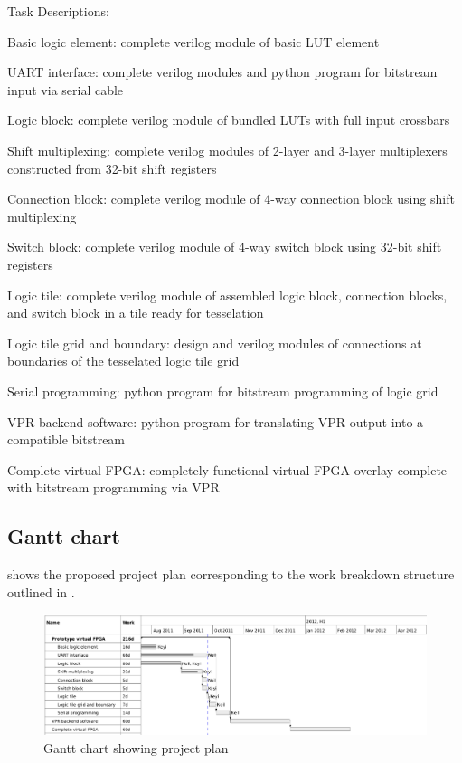 Task Descriptions:
\begin{itemlist}
	\item Basic logic element: complete verilog module of basic LUT element
	\item UART interface: complete verilog modules and python program for bitstream input via serial cable
	\item Logic block: complete verilog module of bundled LUTs with full input crossbars
	\item Shift multiplexing: complete verilog modules of 2-layer and 3-layer multiplexers constructed from 32-bit shift registers
	\item Connection block: complete verilog module of 4-way connection block using shift multiplexing
	\item Switch block: complete verilog module of 4-way switch block using 32-bit shift registers
	\item Logic tile: complete verilog module of assembled logic block, connection blocks, and switch block in a tile ready for tesselation
	\item Logic tile grid and boundary: design and verilog modules of connections at boundaries of the tesselated logic tile grid
	\item Serial programming: python program for bitstream programming of logic grid
	\item VPR backend software: python program for translating VPR output into a compatible bitstream
	\item Complete virtual FPGA: completely functional virtual FPGA overlay complete with bitstream programming via VPR


\subsection{Gantt chart} %

 shows the proposed project plan corresponding to the work breakdown structure outlined in .

\begin{figure}[h!]
	\centering
	\includegraphics[scale=0.43]{gantt.png}
	\caption{Gantt chart showing project plan}
	\label{gantt-chart}
\end{figure}



\end{itemlist}

